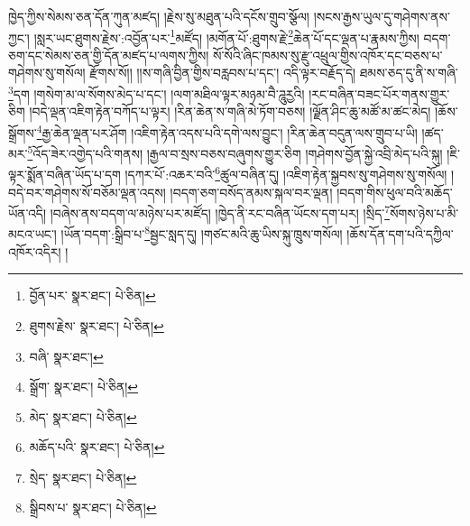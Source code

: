 ཁྱེད་ཀྱིས་སེམས་ཅན་དོན་ཀུན་མཛད། །རྗེས་སུ་མཐུན་པའི་དངོས་གྲུབ་སྩོལ། །སངས་རྒྱས་ཡུལ་དུ་གཤེགས་ནས་ཀྱང་། །སླར་ཡང་ཐུགས་རྗེས་:འབྱོན་པར་\footnote{བྱོན་པར་  སྣར་ཐང་།  པེ་ཅིན། }མཛོད། །མགོན་པོ་:ཐུགས་རྗེ་\footnote{ཐུགས་རྗེས་  སྣར་ཐང་།  པེ་ཅིན། }ཆེན་པོ་དང་ལྡན་པ་རྣམས་ཀྱིས། བདག་ཅག་དང་སེམས་ཅན་གྱི་དོན་མཛད་པ་ལགས་ཀྱིས། སོ་སོའི་ཞིང་ཁམས་སུ་རྫུ་འཕྲུལ་གྱིས་འཁོར་དང་བཅས་པ་གཤེགས་སུ་གསོལ། རྫོགས་སོ།། །།ས་གཞི་བྱིན་གྱིས་བརླབས་པ་དང་། འདི་ལྟར་བརྗོད་དེ། ཐམས་ཅད་དུ་ནི་ས་གཞི་\footnote{བཞི་  སྣར་ཐང་། }དག །གསེག་མ་ལ་སོགས་མེད་པ་དང་། །ལག་མཐིལ་ལྟར་མཉམ་བཻ་ཌཱུརྱའི། །རང་བཞིན་བཟང་པོར་གནས་གྱུར་ཅིག །བདེ་ལྡན་འཇིག་རྟེན་བཀོད་པ་ལྟར། །རིན་ཆེན་ས་གཞི་མེ་ཏོག་བཅས། །ལྗོན་ཤིང་ཆུ་མཚོ་མ་ཚང་མེད། །ཆོས་སྒྲོགས་\footnote{སྒྲོག་  སྣར་ཐང་།  པེ་ཅིན། }རྒྱ་ཆེན་ལྡན་པར་ཤོག །འཇིག་རྟེན་འདས་པའི་དགེ་ལས་བྱུང་། །རིན་ཆེན་བདུན་ལས་གྲུབ་པ་ཡི། །ཚད་མར་\footnote{མེད་  སྣར་ཐང་།  པེ་ཅིན། }འོད་ཟེར་འགྱེད་པའི་གནས། །རྒྱལ་བ་སྲས་བཅས་བཞུགས་གྱུར་ཅིག །གཤེགས་བྱོན་སྐྱེ་འབྲི་མེད་པའི་སྐུ། །ཇི་ལྟར་སྨོན་བཞིན་ཡོད་པ་དག །དཀར་པོ་:འཆར་བའི་\footnote{མཆོད་པའི་  སྣར་ཐང་།  པེ་ཅིན། }ཚུལ་བཞིན་དུ། །འཇིག་རྟེན་སྐྱབས་སུ་གཤེགས་སུ་གསོལ། །བདེ་བར་གཤེགས་སོ་བཅོམ་ལྡན་འདས། །བདག་ཅག་བསོད་ནམས་སྐལ་བར་ལྡན། །བདག་གིས་ཕུལ་བའི་མཆོད་ཡོན་འདི། །བཞེས་ནས་བདག་ལ་མཉེས་པར་མཛོད། །ཁྱེད་ནི་རང་བཞིན་ཡོངས་དག་པར། །སྲིད་\footnote{སྲེད་  སྣར་ཐང་།  པེ་ཅིན། }སོགས་ཉེས་པ་མི་མངའ་ཡང་། །ཡོན་བདག་:སྒྲིབ་པ་\footnote{སྒྲིབས་པ་  སྣར་ཐང་།  པེ་ཅིན། }སྦྱང་སླད་དུ། །གཙང་མའི་ཆུ་ཡིས་སྐུ་ཁྲུས་གསོལ། །ཆོས་དོན་དག་པའི་དཀྱིལ་འཁོར་འདིར། །
